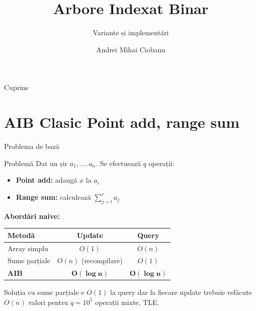 \documentclass[10pt]{beamer}
\title{Arbore Indexat Binar}
\subtitle{Variante și implementări}
\author{Andrei Mihai Ciobanu}
\institute{Algolymp Summer School}
\date{}
\begin{document}
\begin{frame}
  \titlepage
\end{frame}

\begin{frame}{Cuprins}
  \tableofcontents[hideallsubsections]
\end{frame}

\section{AIB Clasic \textemdash{} Point add, range sum}

\begin{frame}{Problema de bază}
  \begin{block}{Problemă}
    Dat un șir $a_1, \ldots, a_n$. Se efectuează $q$ operații:
    \begin{itemize}\itemsep0pt
      \item \textbf{Point add:} adaugă $x$ la $a_i$
      \item \textbf{Range sum:} calculează $\sum_{j=l}^{r} a_j$
    \end{itemize}
  \end{block}
  \smallskip
  \textbf{Abordări naive:}
  \begin{center}
  \begin{tabular}{lcc}
    \toprule
    Metodă & Update & Query \\
    \midrule
    Array simplu & $O(1)$ & $O(n)$ \\
    Sume parțiale & $O(n)$ (recompilare) & $O(1)$ \\
    \textbf{AIB} & $\mathbf{O(\log n)}$ & $\mathbf{O(\log n)}$ \\
    \bottomrule
  \end{tabular}
  \end{center}
  \smallskip
  Soluția cu sume parțiale e $O(1)$ la query dar la fiecare update
  trebuie refăcute $O(n)$ valori \textemdash{} pentru $q = 10^5$ operații mixte, TLE.
\end{frame}
\end{document}
